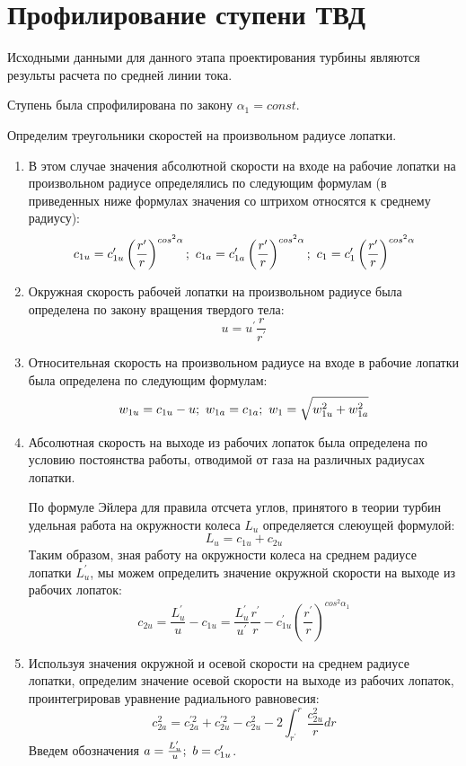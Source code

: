 \section{Профилирование ступени ТВД}
Исходными данными для данного этапа проектирования турбины являются результы расчета по средней линии тока.

Ступень была спрофилирована по закону $\alpha_1=const$.

Определим треугольники скоростей на произвольном радиусе лопатки.

\begin{enumerate}

	\item В этом случае значения абсолютной скорости на входе на рабочие лопатки на произвольном радиусе определялись по следующим формулам (в приведенных ниже формулах значения со штрихом относятся к среднему радиусу):
		$$
			c_{1u} = c_{1u}^\prime \left( \frac{r^\prime}{r} \right)^{cos^2\alpha}; \/\
			c_{1a} = c_{1a}^\prime \left( \frac{r^\prime}{r} \right)^{cos^2\alpha}; \/\
			c_1 = c_1^\prime \left( \frac{r^\prime}{r} \right)^{cos^2\alpha}
		$$

	\item Окружная скорость рабочей лопатки на произвольном радиусе была определена по закону вращения твердого тела:
		$$
			u = u^\prime \frac{r}{r^\prime}
		$$

	\item Относительная скорость на произвольном радиусе на входе в рабочие лопатки была определена по следующим формулам:
		$$
			w_{1u} = c_{1u} - u; \/\ 
			w_{1a} = c_{1a}; \/\ 
			w_1 = \sqrt{w_{1u}^2 + w_{1a}^2}
		$$

	\item Абсолютная скорость на выходе из рабочих лопаток была определена по условию постоянства работы, отводимой от газа на различных радиусах лопатки.

	По формуле Эйлера для правила отсчета углов, принятого в теории турбин удельная работа на окружности колеса $L_u$ определяется слеюущей формулой:
		$$
			L_u = c_{1u} + c_{2u}
		$$
	Таким образом, зная работу на окружности колеса на среднем радиусе лопатки $L_u^\prime$, мы можем определить значение окружной скорости на выходе из рабочих лопаток:
		$$
			c_{2u} = \frac{L_u^\prime}{u} - c_{1u} =
				\frac{L_u^\prime}{u^\prime} 
				\frac{r^\prime}{r} - 
				c_{1u}^\prime \left( 
					\frac{r^\prime}{r} 
				\right)^{cos^2\alpha_1} 
		$$

	\item Используя значения окружной и осевой скорости на среднем радиусе лопатки, определим значение осевой скорости на выходе из рабочих лопаток, проинтегрировав уравнение радиального равновесия:
		$$
			c_{2a}^2 = c_{2a}^{\prime 2} + c_{2u}^{\prime 2} - c_{2u}^{2} - 2 \int_{r^\prime}^r \frac{c_{2u}^2}{r} dr
		$$
	Введем обозначения $a = \frac{L_u^\prime}{u}; \/\ b = c_{1u}^\prime$.


\end{enumerate}
